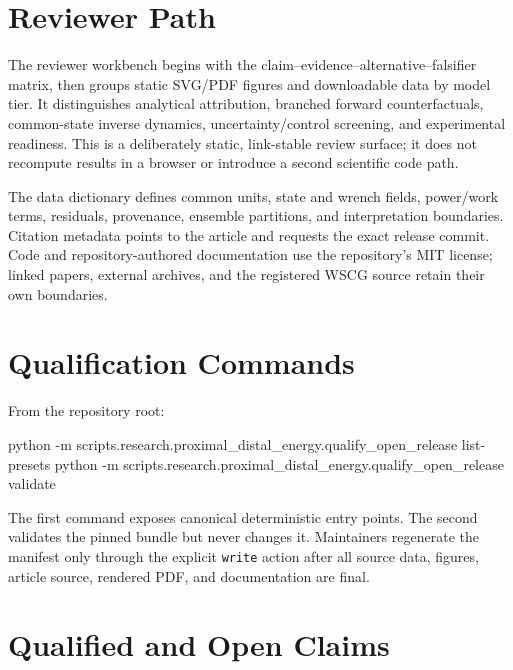 \documentclass[
  letterpaper,
]{report}
\newenvironment{Shaded}{\begin{snugshade}}{\end{snugshade}}
\newcommand{\AttributeTok}[1]{\textcolor[rgb]{0.40,0.45,0.13}{#1}}
\newcommand{\ExtensionTok}[1]{\textcolor[rgb]{0.00,0.23,0.31}{#1}}
\newcommand{\NormalTok}[1]{\textcolor[rgb]{0.00,0.23,0.31}{#1}}
\begin{document}
\section{Reviewer Path}\label{reviewer-path}

The reviewer workbench begins with the
claim--evidence--alternative--falsifier matrix, then groups static
SVG/PDF figures and downloadable data by model tier. It distinguishes
analytical attribution, branched forward counterfactuals, common-state
inverse dynamics, uncertainty/control screening, and experimental
readiness. This is a deliberately static, link-stable review surface; it
does not recompute results in a browser or introduce a second scientific
code path.

The data dictionary defines common units, state and wrench fields,
power/work terms, residuals, provenance, ensemble partitions, and
interpretation boundaries. Citation metadata points to the article and
requests the exact release commit. Code and repository-authored
documentation use the repository's MIT license; linked papers, external
archives, and the registered WSCG source retain their own boundaries.

\section{Qualification Commands}\label{qualification-commands}

From the repository root:

\begin{Shaded}
\begin{Highlighting}[]
\ExtensionTok{python} \AttributeTok{{-}m}\NormalTok{ scripts.research.proximal\_distal\_energy.qualify\_open\_release list{-}presets}
\ExtensionTok{python} \AttributeTok{{-}m}\NormalTok{ scripts.research.proximal\_distal\_energy.qualify\_open\_release validate}
\end{Highlighting}
\end{Shaded}

The first command exposes canonical deterministic entry points. The
second validates the pinned bundle but never changes it. Maintainers
regenerate the manifest only through the explicit \texttt{write} action
after all source data, figures, article source, rendered PDF, and
documentation are final.

\section{Qualified and Open Claims}\label{qualified-and-open-claims}
\end{document}
